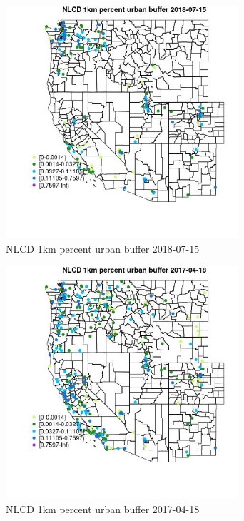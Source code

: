 \begin{figure} 
\centering  
\includegraphics[width=0.77\textwidth]{Code_Outputs/Report_ML_input_PM25_Step4_part_e_de_duplicated_aves_compiled_2019-05-21wNAs_MapObsNLCD_1km_percent_urban_buffer2018-07-15.jpg} 
\caption{\label{fig:Report_ML_input_PM25_Step4_part_e_de_duplicated_aves_compiled_2019-05-21wNAsMapObsNLCD_1km_percent_urban_buffer2018-07-15}NLCD 1km percent urban buffer 2018-07-15} 
\end{figure} 
 

\begin{figure} 
\centering  
\includegraphics[width=0.77\textwidth]{Code_Outputs/Report_ML_input_PM25_Step4_part_e_de_duplicated_aves_compiled_2019-05-21wNAs_MapObsNLCD_1km_percent_urban_buffer2017-04-18.jpg} 
\caption{\label{fig:Report_ML_input_PM25_Step4_part_e_de_duplicated_aves_compiled_2019-05-21wNAsMapObsNLCD_1km_percent_urban_buffer2017-04-18}NLCD 1km percent urban buffer 2017-04-18} 
\end{figure} 
 

